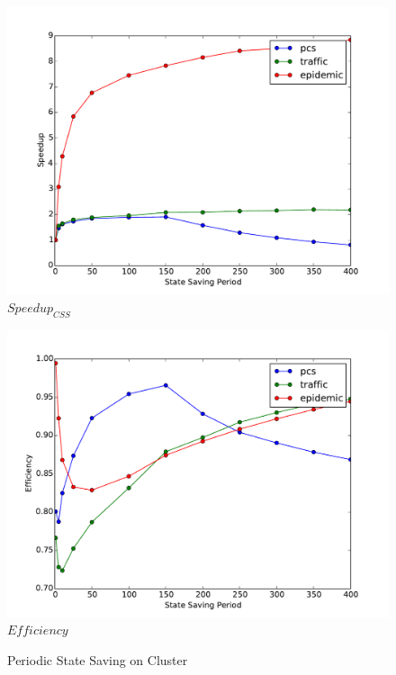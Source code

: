 \documentclass[11pt]{book}
\begin{document}
\begin{figure}
  \begin{minipage}{.5\textwidth}
    \begin{center}
      \includegraphics[width=\textwidth,keepaspectratio,quiet]{figs/state_saving/beowulf/speedup.pdf} \\
      $Speedup_{CSS}$ \\
    \end{center}
  \end{minipage}%
  \hfill
  \begin{minipage}{.5\textwidth}
    \begin{center}
      \includegraphics[width=\textwidth,keepaspectratio,quiet]{figs/state_saving/beowulf/efficiency.pdf} \\
      $Efficiency$ \\
    \end{center}
  \end{minipage}
  \caption{Periodic State Saving on Cluster}\label{ssp_analysis_cluster}
\end{figure}
\end{document}
